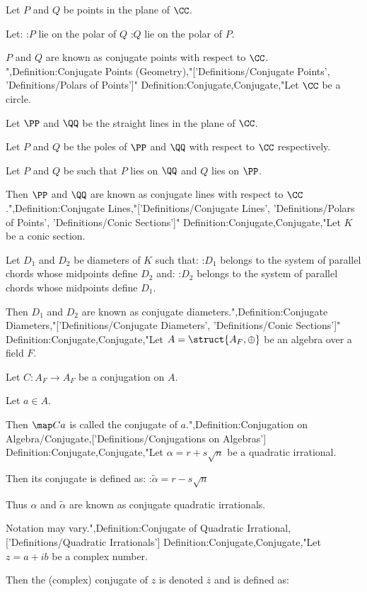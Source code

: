 Let $P$ and $Q$ be points in the plane of $\CC$.

Let:
:$P$ lie on the polar of $Q$
:$Q$ lie on the polar of $P$.


$P$ and $Q$ are known as conjugate points with respect to $\CC$.
",Definition:Conjugate Points (Geometry),"['Definitions/Conjugate Points', 'Definitions/Polars of Points']"
Definition:Conjugate,Conjugate,"Let $\CC$ be a circle.

Let $\PP$ and $\QQ$ be the straight lines in the plane of $\CC$.


Let $P$ and $Q$ be the poles of $\PP$ and $\QQ$ with respect to $\CC$ respectively.

Let $P$ and $Q$ be such that $P$ lies on $\QQ$ and $Q$ lies on $\PP$.

Then $\PP$ and $\QQ$ are known as conjugate lines with respect to $\CC$.",Definition:Conjugate Lines,"['Definitions/Conjugate Lines', 'Definitions/Polars of Points', 'Definitions/Conic Sections']"
Definition:Conjugate,Conjugate,"Let $K$ be a conic section.

Let $D_1$ and $D_2$ be diameters of $K$ such that:
:$D_1$ belongs to the system of parallel chords whose midpoints define $D_2$
and:
:$D_2$ belongs to the system of parallel chords whose midpoints define $D_1$.

Then $D_1$ and $D_2$ are known as conjugate diameters.",Definition:Conjugate Diameters,"['Definitions/Conjugate Diameters', 'Definitions/Conic Sections']"
Definition:Conjugate,Conjugate,"Let $A = \struct {A_F, \oplus}$ be an algebra over a field $F$.

Let $C: A_F \to A_F$ be a conjugation on $A$.

Let $a \in A$.


Then $\map C a$ is called the conjugate of $a$.",Definition:Conjugation on Algebra/Conjugate,['Definitions/Conjugations on Algebras']
Definition:Conjugate,Conjugate,"Let $\alpha = r + s \sqrt n$ be a quadratic irrational.


Then its conjugate is defined as:
:$\tilde \alpha = r - s \sqrt n$


Thus $\alpha$ and $\tilde \alpha$ are known as conjugate quadratic irrationals.


Notation may vary.",Definition:Conjugate of Quadratic Irrational,['Definitions/Quadratic Irrationals']
Definition:Conjugate,Conjugate,"Let $z = a + i b$ be a complex number.


Then the (complex) conjugate of $z$ is denoted $\overline z$ and is defined as:

